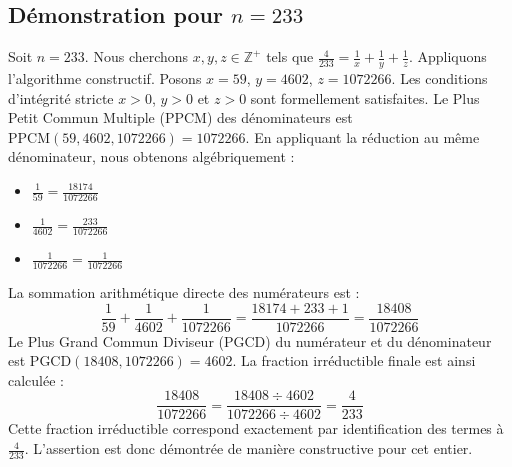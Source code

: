\documentclass[11pt,a4paper]{article}
\begin{document}
\subsection{Démonstration pour $n = 233$}
Soit $n = 233$. Nous cherchons $x, y, z \in \mathbb{Z}^{+}$ tels que $\frac{4}{233} = \frac{1}{x} + \frac{1}{y} + \frac{1}{z}$.
Appliquons l'algorithme constructif. Posons $x = 59$, $y = 4602$, $z = 1072266$.
Les conditions d'intégrité stricte $x > 0$, $y > 0$ et $z > 0$ sont formellement satisfaites.
Le Plus Petit Commun Multiple (PPCM) des dénominateurs est $\text{PPCM}(59, 4602, 1072266) = 1072266$.
En appliquant la réduction au même dénominateur, nous obtenons algébriquement :
\begin{itemize}
    \item $\frac{1}{59} = \frac{18174}{1072266}$
    \item $\frac{1}{4602} = \frac{233}{1072266}$
    \item $\frac{1}{1072266} = \frac{1}{1072266}$
\end{itemize}
La sommation arithmétique directe des numérateurs est :
$$ \frac{1}{59} + \frac{1}{4602} + \frac{1}{1072266} = \frac{18174 + 233 + 1}{1072266} = \frac{18408}{1072266} $$
Le Plus Grand Commun Diviseur (PGCD) du numérateur et du dénominateur est $\text{PGCD}(18408, 1072266) = 4602$.
La fraction irréductible finale est ainsi calculée :
$$ \frac{18408}{1072266} = \frac{18408 \div 4602}{1072266 \div 4602} = \frac{4}{233} $$
Cette fraction irréductible correspond exactement par identification des termes à $\frac{4}{233}$. L'assertion est donc démontrée de manière constructive pour cet entier.
\end{document}
